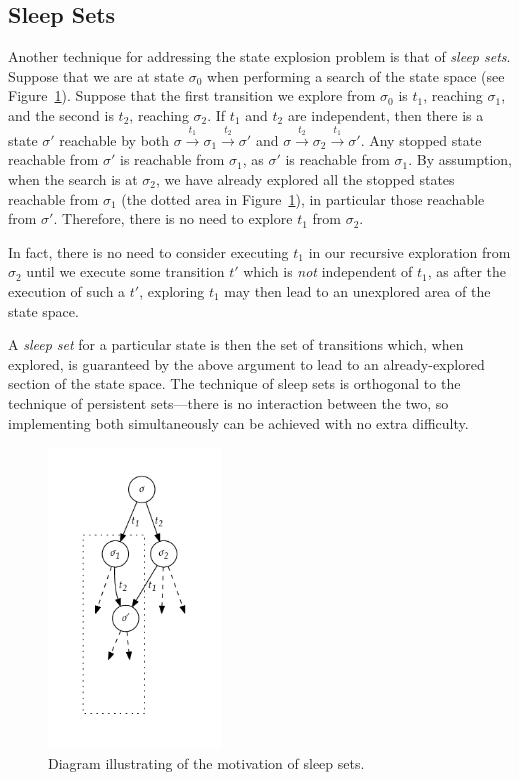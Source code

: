 \documentclass[12pt,a4paper,twoside,openright]{report}
\begin{document}
\subsection{Sleep Sets}
\label{sec:sleep-prep}
Another technique for addressing the state explosion
problem is that of \emph{sleep sets}. Suppose that
we are at state $\sigma_0$ when performing a search
of the state space (see Figure~\ref{fig:sleep}).
Suppose that the first transition
we explore from $\sigma_0$ is $t_1$, reaching $\sigma_1$,
and the second is $t_2$, reaching $\sigma_2$.
If $t_1$ and $t_2$ are independent, then there
is a state $\sigma'$ reachable by both
$\sigma \xrightarrow{t_1} \sigma_1
\xrightarrow{t_2} \sigma'$ and
$\sigma \xrightarrow{t_2} \sigma_2
\xrightarrow{t_1} \sigma'$.
Any stopped state reachable from $\sigma'$
is reachable from $\sigma_1$, as $\sigma'$
is reachable from $\sigma_1$. By assumption,
when the search is at $\sigma_2$, we have already
explored all the stopped states reachable from
$\sigma_1$ (the dotted area in Figure~\ref{fig:sleep}),
in particular those reachable from
$\sigma'$. Therefore, there is no need to
explore $t_1$ from $\sigma_2$.

In fact, there is no need to consider executing
$t_1$ in our recursive exploration from $\sigma_2$
until we execute some transition $t'$ which is
\emph{not} independent of $t_1$, as after
the execution of such a $t'$, exploring $t_1$ may
then lead to an unexplored area of the state space.

A \emph{sleep set} for a particular state
is then the set of transitions which, when
explored, is guaranteed by the above
argument to lead to an already-explored
section of the state space\footnotemark.
The technique of
sleep sets is orthogonal to the technique
of persistent sets---there is no interaction
between the two, so implementing
both simultaneously can be achieved with
no extra difficulty.

\begin{figure}
	\centering
	\includegraphics[height=8cm]{sleep}
	\caption{Diagram illustrating of the motivation
		of sleep sets.}
	\label{fig:sleep}
\end{figure}
\end{document}

